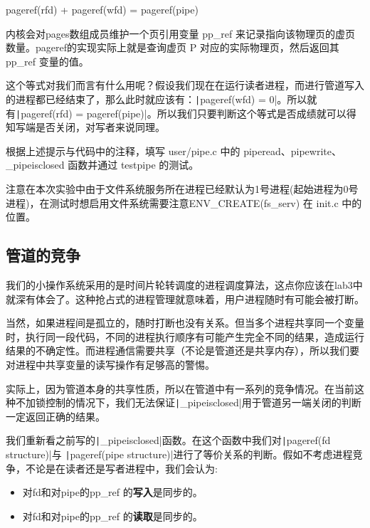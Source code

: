 pageref(rfd) + pageref(wfd) = pageref(pipe)\label{variant}

\begin{note}
内核会对pages数组成员维护一个页引用变量 pp\_ref 来记录指向该物理页的虚页数量。pageref的实现实际上就是查询虚页 P 对应的实际物理页，然后返回其 pp\_ref 变量的值。
\end{note}

这个等式对我们而言有什么用呢？假设我们现在在运行读者进程，而进行管道写入的进程都已经结束了，那么此时就应该有：\texttt|pageref(wfd) = 0|。所以就有\texttt|pageref(rfd) = pageref(pipe)|。所以我们只要判断这个等式是否成绩就可以得知写端是否关闭，对写者来说同理。

\begin{exercise}
	根据上述提示与代码中的注释，填写 user/pipe.c 中的 piperead、pipewrite、\_pipeisclosed 函数并通过 testpipe 的测试。
\end{exercise}

\begin{note}
注意在本次实验中由于文件系统服务所在进程已经默认为1号进程(起始进程为0号进程)，在测试时想启用文件系统需要注意ENV\_CREATE(fs\_serv) 在 init.c 中的位置。
\end{note}

\subsection{管道的竞争}

我们的小操作系统采用的是时间片轮转调度的进程调度算法，这点你应该在lab3中就深有体会了。这种抢占式的进程管理就意味着，用户进程随时有可能会被打断。

当然，如果进程间是孤立的，随时打断也没有关系。但当多个进程共享同一个变量时，执行同一段代码，不同的进程执行顺序有可能产生完全不同的结果，造成运行结果的不确定性。而进程通信需要共享（不论是管道还是共享内存），所以我们要对进程中共享变量的读写操作有足够高的警惕。

实际上，因为管道本身的共享性质，所以在管道中有一系列的竞争情况。在当前这种不加锁控制的情况下，我们无法保证\texttt|_pipeisclosed|用于管道另一端关闭的判断一定返回正确的结果。

我们重新看之前写的\texttt|_pipeisclosed|函数。在这个函数中我们对\texttt|pageref(fd structure)|与 
\texttt|pageref(pipe structure)|进行了等价关系的判断。假如不考虑进程竞争，不论是在读者还是写者进程中，我们会认为:

\begin{itemize}
	\item 对fd和对pipe的pp\_ref 的\textbf{写入}是同步的。
	\item 对fd和对pipe的pp\_ref 的\textbf{读取}是同步的。 
\end{itemize}


